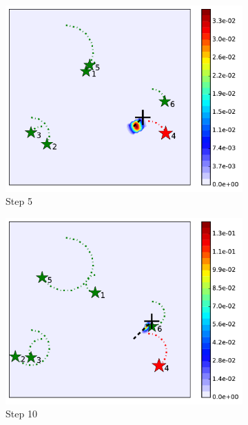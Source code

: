 \documentclass[journal]{IEEEtranTIE}
\theoremstyle{remark}
\begin{document}
\begin{figure}
\begin{subfigure}[b]{0.23\textwidth}
		\includegraphics[width=\textwidth]{figures/hetero_mov_sen_mov_tar_rbt4_step5}
		\caption{Step 5}\label{fig:htr_mov_sen_mov_tar_sing3}
	\end{subfigure}
	\begin{subfigure}[b]{0.23\textwidth}
		\includegraphics[width=\textwidth]{figures/hetero_mov_sen_mov_tar_rbt4_step10}
		\caption{Step 10}\label{fig:htr_mov_sen_mov_tar_sing4}
	\end{subfigure}
	\begin{subfigure}[b]{0.23\textwidth}

\end{subfigure}
\end{figure}
\end{document}

